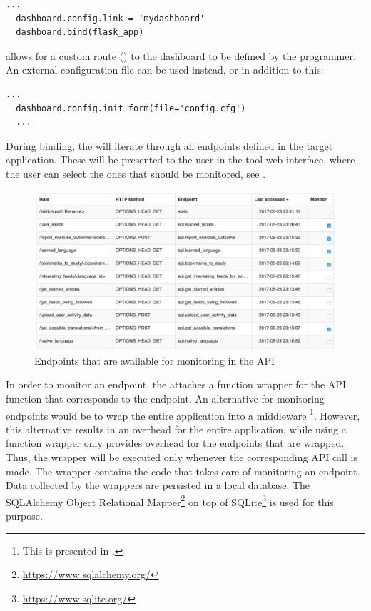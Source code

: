 \documentclass[conference]{IEEEtran}
\begin{document}
  \begin{lstlisting}[style=custompython]
  ...
  dashboard.config.link = 'mydashboard'
  dashboard.bind(flask_app)
  \end{lstlisting}
  
  allows for a custom route () to the dashboard to be defined by the programmer. An external configuration file can be used instead, or in addition to this:
  
  \begin{lstlisting}[style=custompython]
  ...
  dashboard.config.init_form(file='config.cfg')
  ...
  \end{lstlisting}

  During binding, the \tool will iterate through all endpoints defined in the target application. These will be presented to the user in the tool web interface, where the user can select the ones that should be monitored, see . 

    \begin{figure}
      \centering
      \includegraphics[width=\linewidth]{selecting_endpoints.png}
      \caption{Endpoints that are available for monitoring in the \zee API}
      \label{fig:sep}
    \end{figure}

  In order to monitor an endpoint, the \tool attaches a function wrapper for the API function that corresponds to the endpoint. An alternative for monitoring endpoints would be to wrap the entire application into a middleware \footnote{This is presented in \cite{Zeng}.}. However, this alternative results in an overhead for the entire application, while using a function wrapper only provides overhead for the endpoints that are wrapped. Thus, the wrapper will be executed only whenever the corresponding API call is made. The wrapper contains the code that takes care of monitoring an endpoint. Data collected by the wrappers are persisted in a local database. The SQLAlchemy Object Relational Mapper\footnote{\url{https://www.sqlalchemy.org/}} on top of SQLite\footnote{\url{https://www.sqlite.org/}} is used for this purpose.
  
\end{document}

